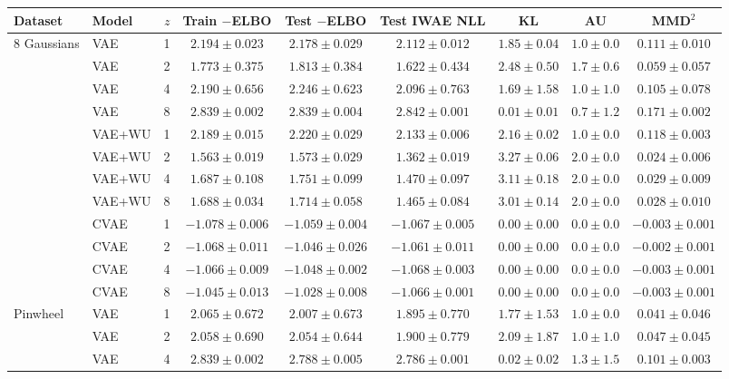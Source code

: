 \begin{tabular}{llrcccccc}
\toprule
Dataset & Model & $z$ & Train $-$ELBO & Test $-$ELBO & Test IWAE NLL & KL & AU & MMD$^2$ \\
\midrule
8 Gaussians & VAE & 1 & $2.194\pm0.023$ & $2.178\pm0.029$ & $2.112\pm0.012$ & $1.85\pm0.04$ & $1.0\pm0.0$ & $0.111\pm0.010$ \\
 & VAE & 2 & $1.773\pm0.375$ & $1.813\pm0.384$ & $1.622\pm0.434$ & $2.48\pm0.50$ & $1.7\pm0.6$ & $0.059\pm0.057$ \\
 & VAE & 4 & $2.190\pm0.656$ & $2.246\pm0.623$ & $2.096\pm0.763$ & $1.69\pm1.58$ & $1.0\pm1.0$ & $0.105\pm0.078$ \\
 & VAE & 8 & $2.839\pm0.002$ & $2.839\pm0.004$ & $2.842\pm0.001$ & $0.01\pm0.01$ & $0.7\pm1.2$ & $0.171\pm0.002$ \\
\cmidrule{2-9}
 & VAE+WU & 1 & $2.189\pm0.015$ & $2.220\pm0.029$ & $2.133\pm0.006$ & $2.16\pm0.02$ & $1.0\pm0.0$ & $0.118\pm0.003$ \\
 & VAE+WU & 2 & $1.563\pm0.019$ & $1.573\pm0.029$ & $1.362\pm0.019$ & $3.27\pm0.06$ & $2.0\pm0.0$ & $0.024\pm0.006$ \\
 & VAE+WU & 4 & $1.687\pm0.108$ & $1.751\pm0.099$ & $1.470\pm0.097$ & $3.11\pm0.18$ & $2.0\pm0.0$ & $0.029\pm0.009$ \\
 & VAE+WU & 8 & $1.688\pm0.034$ & $1.714\pm0.058$ & $1.465\pm0.084$ & $3.01\pm0.14$ & $2.0\pm0.0$ & $0.028\pm0.010$ \\
\cmidrule{2-9}
 & CVAE & 1 & $-1.078\pm0.006$ & $-1.059\pm0.004$ & $-1.067\pm0.005$ & $0.00\pm0.00$ & $0.0\pm0.0$ & $-0.003\pm0.001$ \\
 & CVAE & 2 & $-1.068\pm0.011$ & $-1.046\pm0.026$ & $-1.061\pm0.011$ & $0.00\pm0.00$ & $0.0\pm0.0$ & $-0.002\pm0.001$ \\
 & CVAE & 4 & $-1.066\pm0.009$ & $-1.048\pm0.002$ & $\mathbf{-1.068\pm0.003}$ & $0.00\pm0.00$ & $0.0\pm0.0$ & $-0.003\pm0.001$ \\
 & CVAE & 8 & $-1.045\pm0.013$ & $-1.028\pm0.008$ & $-1.066\pm0.001$ & $0.00\pm0.00$ & $0.0\pm0.0$ & $-0.003\pm0.001$ \\
\midrule
Pinwheel & VAE & 1 & $2.065\pm0.672$ & $2.007\pm0.673$ & $1.895\pm0.770$ & $1.77\pm1.53$ & $1.0\pm0.0$ & $0.041\pm0.046$ \\
 & VAE & 2 & $2.058\pm0.690$ & $2.054\pm0.644$ & $1.900\pm0.779$ & $2.09\pm1.87$ & $1.0\pm1.0$ & $0.047\pm0.045$ \\
 & VAE & 4 & $2.839\pm0.002$ & $2.788\pm0.005$ & $2.786\pm0.001$ & $0.02\pm0.02$ & $1.3\pm1.5$ & $0.101\pm0.003$ \\

\end{tabular}
